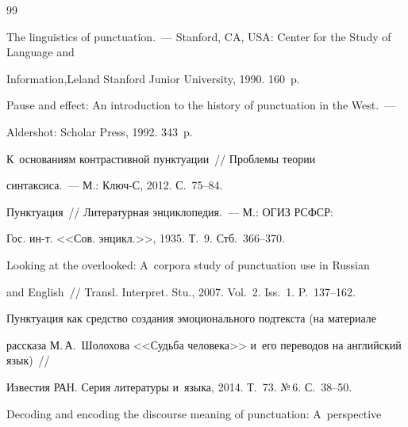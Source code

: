 {\small\frenchspacing


{%




\begin{thebibliography}{99}




 The linguistics of punctuation.~--- Stanford, CA, USA: Center for the Study of Language and 


Information,Leland Stanford Junior University, 1990. 160~p.




 Pause and effect: An introduction to the history of punctuation in the West.~--- 


Aldershot: Scholar Press, 1992. 343~p.




 К~основаниям контрастивной пунктуации~/\!\!/ Проб\-ле\-мы тео\-рии 


синтаксиса.~--- М.: Ключ-С, 2012. С.~75--84.




 Пунктуация~/\!\!/ Литературная энциклопедия.~--- М.: ОГИЗ РСФСР: 


Гос. ин-т. <<Сов. энцикл.>>, 1935. Т.~9. Стб.~366--370.




 Looking at the overlooked: A~corpora study of punctuation use in Russian 


and English~/\!\!/ Transl. Interpret. Stu., 2007. Vol.~2. Iss.~1. P.~137--162.




 Пунктуация как средство создания эмоционального подтекста (на материале 


рассказа М.\,А.~Шолохова <<Судьба человека>> и~его переводов на английский язык)~/\!\!/ 


Известия РАН. Серия литературы и~языка, 2014. Т.~73. №\,6. С.~38--50.
















 Decoding and encoding the discourse meaning of punctuation: A~perspective 



\end{thebibliography}}}

